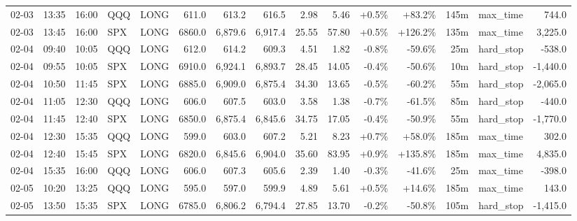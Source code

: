 \documentclass[11pt,a4paper,twoside]{article}
\begin{document}
\begin{landscape}
\begin{center}
\begin{longtable}{>{\color{txtmain}}l l l l l r r r r r r r r >{\color{txtmain}}l r}
02-03 & 13:35 & 16:00 & QQQ & LONG & 611.0 & 613.2 & 616.5 & 2.98 & 5.46 & \textcolor{wingreen}{+0.5\%} & \textcolor{wingreen}{+83.2\%} & 145m & max\_time & \textcolor{wingreen}{744.0} \\
02-03 & 13:45 & 16:00 & SPX & LONG & 6860.0 & 6,879.6 & 6,917.4 & 25.55 & 57.80 & \textcolor{wingreen}{+0.5\%} & \textcolor{wingreen}{+126.2\%} & 135m & max\_time & \textcolor{wingreen}{3,225.0} \\
02-04 & 09:40 & 10:05 & QQQ & LONG & 612.0 & 614.2 & 609.3 & 4.51 & 1.82 & \textcolor{lossred}{-0.8\%} & \textcolor{lossred}{-59.6\%} & 25m & hard\_stop & \textcolor{lossred}{-538.0} \\
02-04 & 09:55 & 10:05 & SPX & LONG & 6910.0 & 6,924.1 & 6,893.7 & 28.45 & 14.05 & \textcolor{lossred}{-0.4\%} & \textcolor{lossred}{-50.6\%} & 10m & hard\_stop & \textcolor{lossred}{-1,440.0} \\
02-04 & 10:50 & 11:45 & SPX & LONG & 6885.0 & 6,909.0 & 6,875.4 & 34.30 & 13.65 & \textcolor{lossred}{-0.5\%} & \textcolor{lossred}{-60.2\%} & 55m & hard\_stop & \textcolor{lossred}{-2,065.0} \\
02-04 & 11:05 & 12:30 & QQQ & LONG & 606.0 & 607.5 & 603.0 & 3.58 & 1.38 & \textcolor{lossred}{-0.7\%} & \textcolor{lossred}{-61.5\%} & 85m & hard\_stop & \textcolor{lossred}{-440.0} \\
02-04 & 11:45 & 12:40 & SPX & LONG & 6850.0 & 6,875.4 & 6,845.6 & 34.75 & 17.05 & \textcolor{lossred}{-0.4\%} & \textcolor{lossred}{-50.9\%} & 55m & hard\_stop & \textcolor{lossred}{-1,770.0} \\
02-04 & 12:30 & 15:35 & QQQ & LONG & 599.0 & 603.0 & 607.2 & 5.21 & 8.23 & \textcolor{wingreen}{+0.7\%} & \textcolor{wingreen}{+58.0\%} & 185m & max\_time & \textcolor{wingreen}{302.0} \\
02-04 & 12:40 & 15:45 & SPX & LONG & 6820.0 & 6,845.6 & 6,904.0 & 35.60 & 83.95 & \textcolor{wingreen}{+0.9\%} & \textcolor{wingreen}{+135.8\%} & 185m & max\_time & \textcolor{wingreen}{4,835.0} \\
02-04 & 15:35 & 16:00 & QQQ & LONG & 606.0 & 607.3 & 605.6 & 2.39 & 1.40 & \textcolor{lossred}{-0.3\%} & \textcolor{lossred}{-41.6\%} & 25m & max\_time & \textcolor{lossred}{-398.0} \\
02-05 & 10:20 & 13:25 & QQQ & LONG & 595.0 & 597.0 & 599.9 & 4.89 & 5.61 & \textcolor{wingreen}{+0.5\%} & \textcolor{wingreen}{+14.6\%} & 185m & max\_time & \textcolor{wingreen}{143.0} \\
02-05 & 13:50 & 15:35 & SPX & LONG & 6785.0 & 6,806.2 & 6,794.4 & 27.85 & 13.70 & \textcolor{lossred}{-0.2\%} & \textcolor{lossred}{-50.8\%} & 105m & hard\_stop & \textcolor{lossred}{-1,415.0} \\

\end{longtable}
\end{center}
\end{landscape}
\end{document}
